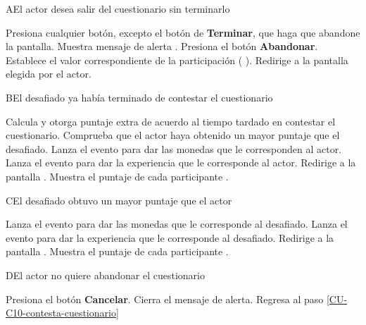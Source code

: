 \begin{UCtrayectoriaA}%
  {A}{El actor desea salir del cuestionario sin terminarlo}

  \Actor Presiona cualquier botón, excepto el botón de {\bf Terminar}, que haga que abandone la pantalla.
  \Sistema Muestra mensaje de alerta .
  \Actor Presiona el botón {\bf Abandonar}. 
  \Sistema Establece el valor correspondiente de la participación  (
  ).
  \Sistema Redirige a la pantalla elegida por el actor.

\end{UCtrayectoriaA}

\begin{UCtrayectoriaA}%
  {B}{El  desafiado ya había terminado de contestar el cuestionario}

  \Sistema Calcula y otorga puntaje extra de acuerdo al tiempo tardado en contestar el cuestionario.
  \Sistema Comprueba que el actor haya obtenido un mayor puntaje que el  desafiado. 
  \Sistema Lanza el evento para dar las monedas que le corresponden al actor.
  \Sistema Lanza el evento para dar la experiencia que le corresponde al actor.
  \Sistema Redirige a la pantalla .
  \Sistema Muestra el puntaje de cada participante .

\end{UCtrayectoriaA}

\begin{UCtrayectoriaA}%
  {C}{El  desafiado obtuvo un mayor puntaje que el actor}

  \Sistema Lanza el evento para dar las monedas que le corresponde al  desafiado.
  \Sistema Lanza el evento para dar la experiencia que le corresponde al  desafiado.
  \Sistema Redirige a la pantalla .
  \Sistema Muestra el puntaje de cada participante .

\end{UCtrayectoriaA}

\begin{UCtrayectoriaA}{D}{El actor no quiere abandonar el cuestionario}

  \Actor Presiona el botón {\bf Cancelar}.
  \Sistema Cierra el mensaje de alerta.
  \Sistema Regresa al paso \ref{CU-C10-contesta-cuestionario}

\end{UCtrayectoriaA}
